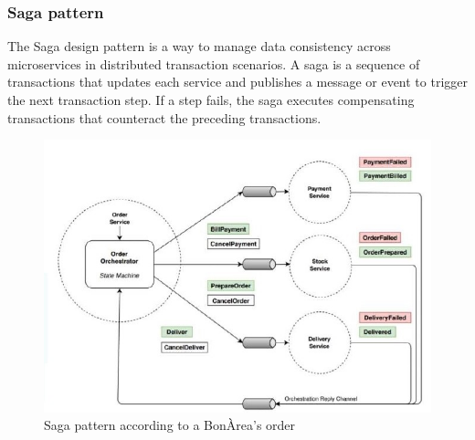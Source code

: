 \documentclass[12pt]{article}
\begin{document}
\subsubsection*{Saga pattern}
The Saga design pattern is a way to manage data consistency across microservices in distributed transaction scenarios. A saga is a sequence of transactions that updates each service and publishes a message or event to trigger the next transaction step. If a step fails, the saga executes compensating transactions that counteract the preceding transactions.
\begin{figure}[H]
    \centering
    \includegraphics[scale = 0.8]{Images/saga_bo.jpg}
    \caption{Saga pattern according to a BonÀrea's order}
    \label{fig:saga}
\end{figure}
\end{document}

